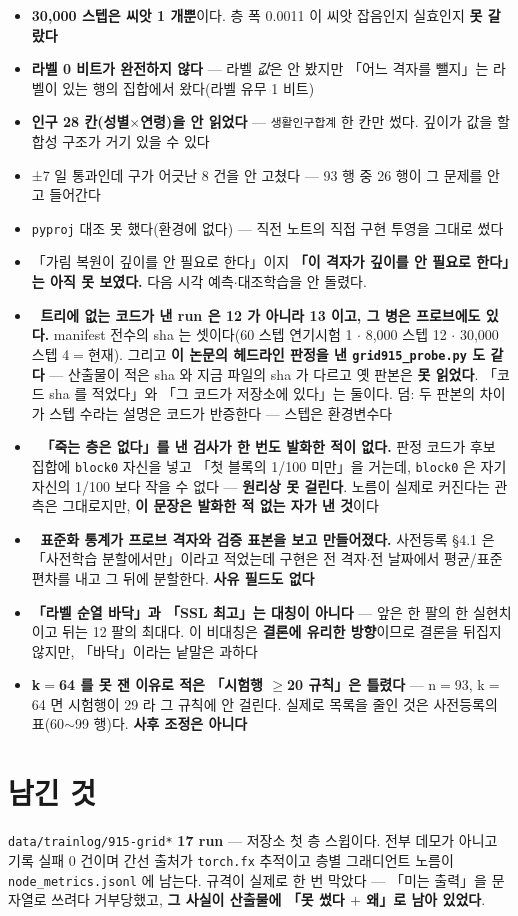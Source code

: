 \documentclass{article}
\begin{document}
\begin{itemize}
\item \textbf{30{,}000 스텝은 씨앗 1 개뿐}이다. 층 폭 0.0011 이 씨앗 잡음인지 실효인지 \textbf{못 갈랐다}
\item \textbf{라벨 0 비트가 완전하지 않다} --- 라벨 \emph{값}은 안 봤지만
      「어느 격자를 뺄지」는 라벨이 있는 행의 집합에서 왔다(라벨 유무 1 비트)
\item \textbf{인구 28 칸(성별$\times$연령)을 안 읽었다} --- \texttt{생활인구합계} 한 칸만 썼다.
      깊이가 값을 할 합성 구조가 거기 있을 수 있다
\item ±7 일 통과인데 구가 어긋난 8 건을 안 고쳤다 --- 93 행 중 26 행이 그 문제를 안고 들어간다
\item \texttt{pyproj} 대조 못 했다(환경에 없다) --- 직전 노트의 직접 구현 투영을 그대로 썼다
\item {}
      {「가림 복원이 깊이를 안 필요로 한다」이지 \textbf{「이 격자가 깊이를 안 필요로 한다」는
      아직 못 보였다.} 다음 시각 예측$\cdot$대조학습을 안 돌렸다.}
\item 🔴 \textbf{트리에 없는 코드가 낸 run 은 12 가 아니라 13 이고, 그 병은 프로브에도 있다.}
      manifest 전수의 sha 는 셋이다(60 스텝 연기시험 1 $\cdot$ 8{,}000 스텝 12 $\cdot$ 30{,}000 스텝 4$=$현재).
      그리고 \textbf{이 논문의 헤드라인 판정을 낸 \texttt{grid915\_probe.py} 도 같다} ---
      산출물이 적은 sha 와 지금 파일의 sha 가 다르고 옛 판본은 \textbf{못 읽었다}.
      「코드 sha 를 적었다」와 「그 코드가 저장소에 있다」는 둘이다.
      덤: 두 판본의 차이가 스텝 수라는 설명은 코드가 반증한다 --- 스텝은 환경변수다
\item 🔴 \textbf{「죽는 층은 없다」를 낸 검사가 한 번도 발화한 적이 없다.}
      판정 코드가 후보 집합에 \texttt{block0} 자신을 넣고 「첫 블록의 1/100 미만」을 거는데,
      \texttt{block0} 은 자기 자신의 1/100 보다 작을 수 없다 --- \textbf{원리상 못 걸린다}.
      노름이 실제로 커진다는 관측은 그대로지만, \textbf{이 문장은 발화한 적 없는 자가 낸 것}이다
\item 🔴 \textbf{표준화 통계가 프로브 격자와 검증 표본을 보고 만들어졌다.}
      사전등록 §4.1 은 「사전학습 분할에서만」이라고 적었는데 구현은 전 격자$\cdot$전 날짜에서
      평균/표준편차를 내고 그 뒤에 분할한다. \textbf{사유 필드도 없다}
\item \textbf{「라벨 순열 바닥」과 「SSL 최고」는 대칭이 아니다} --- 앞은 한 팔의 한 실현치이고
      뒤는 12 팔의 최대다. 이 비대칭은 \textbf{결론에 유리한 방향}이므로 결론을 뒤집지 않지만,
      「바닥」이라는 낱말은 과하다
\item \textbf{k$=$64 를 못 잰 이유로 적은 「시험행 $\ge$20 규칙」은 틀렸다} ---
      n$=$93, k$=$64 면 시험행이 29 라 그 규칙에 안 걸린다.
      실제로 목록을 줄인 것은 사전등록의 표(60$\sim$99 행)다. \textbf{사후 조정은 아니다}
\end{itemize}

\section{남긴 것}

\texttt{data/trainlog/915-grid*} \textbf{17 run} --- 저장소 첫 층 스윕이다.
전부 데모가 아니고 기록 실패 0 건이며 간선 출처가 \texttt{torch.fx} 추적이고
층별 그래디언트 노름이 \texttt{node\_metrics.jsonl} 에 남는다.
규격이 실제로 한 번 막았다 --- 「미는 출력」을 문자열로 쓰려다 거부당했고,
\textbf{그 사실이 산출물에 「못 썼다 $+$ 왜」로 남아 있었다}.
\end{document}
